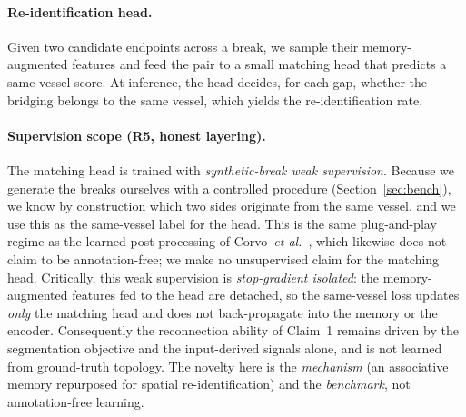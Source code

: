\paragraph{Re-identification head.}
Given two candidate endpoints across a break, we sample their memory-augmented
features and feed the pair to a small matching head that predicts a same-vessel
score. At inference, the head decides, for each gap, whether the bridging belongs to
the same vessel, which yields the re-identification rate.

\paragraph{Supervision scope (R5, honest layering).}
The matching head is trained with \emph{synthetic-break weak supervision}. Because we
generate the breaks ourselves with a controlled procedure
(Section~\ref{sec:bench}), we know by construction which two sides originate from the
same vessel, and we use this as the same-vessel label for the head. This is the same
plug-and-play regime as the learned post-processing of Corvo~\emph{et
al.}~\cite{creatis}, which likewise does not claim to be annotation-free; we make no
unsupervised claim for the matching head. Critically, this weak supervision is
\emph{stop-gradient isolated}: the memory-augmented features fed to the head are
detached, so the same-vessel loss updates \emph{only} the matching head and does not
back-propagate into the memory or the encoder. Consequently the reconnection ability
of Claim~1 remains driven by the segmentation objective and the input-derived signals
alone, and is not learned from ground-truth topology. The novelty here is the
\emph{mechanism} (an associative memory repurposed for spatial re-identification) and
the \emph{benchmark}, not annotation-free learning.

